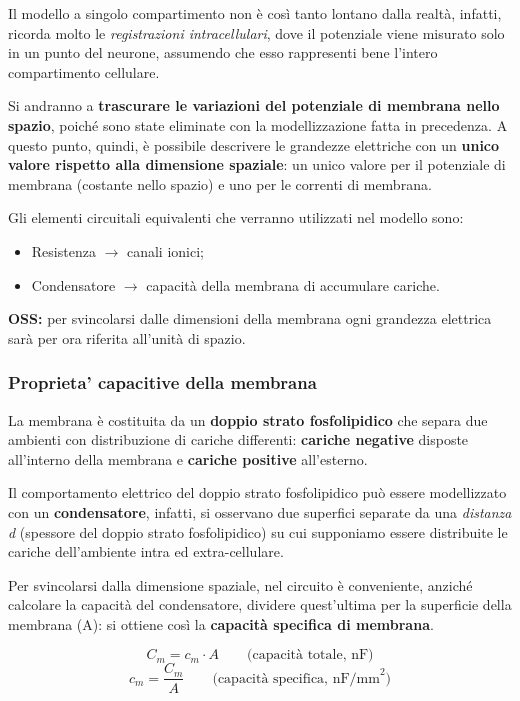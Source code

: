 \documentclass[12pt,a4paper,openany]{book}
\begin{document}
Il modello a singolo compartimento non è così tanto lontano dalla realtà, infatti, ricorda molto le \textit{registrazioni intracellulari}, dove il potenziale viene misurato solo in un punto del neurone, assumendo che esso rappresenti bene l'intero compartimento cellulare.

Si andranno a \textbf{trascurare le variazioni del potenziale di membrana nello spazio}, poiché sono state eliminate con la modellizzazione fatta in precedenza. A questo punto, quindi, è possibile descrivere le grandezze elettriche con un \textbf{unico valore rispetto alla dimensione spaziale}: un unico valore per il potenziale di membrana (costante nello spazio) e uno per le correnti di membrana.

Gli elementi circuitali equivalenti che verranno utilizzati nel modello sono:

\begin{itemize}
  \item Resistenza $\rightarrow$ canali ionici;
  \item Condensatore $\rightarrow$ capacità della membrana di accumulare cariche.
\end{itemize}
\textbf{OSS: }per svincolarsi dalle dimensioni della membrana ogni grandezza elettrica sarà per ora riferita all'unità di spazio.

\subsubsection{Proprieta' capacitive della membrana}

La membrana è costituita da un \textbf{doppio strato fosfolipidico }che separa due ambienti con distribuzione di cariche differenti: \textbf{cariche negative }disposte all'interno della membrana e \textbf{cariche positive }all'esterno.

Il comportamento elettrico del doppio strato fosfolipidico può essere modellizzato con un \textbf{condensatore}, infatti, si osservano due superfici separate da una \textit{distanza d }(spessore del doppio strato fosfolipidico) su cui supponiamo essere distribuite le cariche dell'ambiente intra ed extra-cellulare.

Per svincolarsi dalla dimensione spaziale, nel circuito è conveniente, anziché calcolare la capacità del condensatore, dividere quest'ultima per la superficie della membrana (A): si ottiene così la \textbf{capacità specifica di membrana}.

\[
C_m = c_m \cdot A \qquad \text{(capacità totale, nF)}
\]
\[
c_m = \frac{C_m}{A} \qquad \text{(capacità specifica, nF/mm}^2\text{)}
\]
\end{document}
